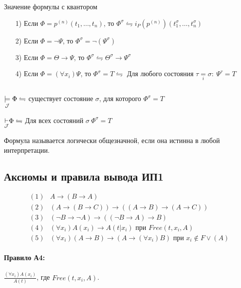 \begin{definition}
Значение формулы с квантором
\begin{itemize}
    \item[1)] Если $\Phi = p^{(n)}(t_1,\ldots,t_n)$, то $\Phi^{\sigma} \leftrightharpoons
        i_P(p^{(n)})(t_1^{\sigma},\ldots,t_n^{\sigma})$ 
    \item[2)] Если $\Phi = \lnot\Psi$, то  $\Phi^{\sigma} = \lnot(\Psi^{\sigma})$ 
    \item[3)] Если $\Phi = \Theta \to \Psi$, то $\Phi^{\sigma} \leftrightharpoons
        \Theta^{\sigma} \to \Psi^{\sigma}$ 
    \item[4)] Если $\Phi = (\forall x_{i})\Psi$, то $\Phi^{\sigma} = T \leftrightharpoons$ 
        Для любого состояния $\tau \underset{i}{=}\sigma :\ \Psi^{\tau} = T$
\end{itemize}
\end{definition}


\begin{definition} ${}$ \newline

$\underset{{\cal J}}{\models} \Phi \leftrightharpoons$ существует состояние $\sigma$, для
которого  $\Phi^{\sigma} = T$

$\underset{{\cal J}}{\operatorname{\vdash}} \Phi \leftrightharpoons$ Для всех состояний $\sigma \ \Phi^{\sigma} = T$

Формула называется логически общезначной, если она истинна в любой интерпретации.
\end{definition}


\subsection{Аксиомы и правила вывода ИП1}


\[
\begin{matrix}
    & (1) & A \to (B \to A)\\
    & (2) & (A \to (B \to C)) \to ((A \to B) \to (A\to C))\\
    & (3) & (\lnot B \to \lnot A) \to ((\lnot B \to A) \to B)\\
    & (4) & (\forall x_{i})A(x_{i}) \to A(t|x_{i})\text{ при } Free(t,x_{i},A)\\
    & (5) & (\forall x_{i})(A \to B) \to (A \to (\forall x_{i})B)\text{ при } x_{i} \not\in F \lor (A)
\end{matrix}
\] 

\paragraph*{Правило А4:} $\frac{(\forall x_{i})A(x_{i})}{A(t)}$, где $Free(t,x_{i},A)$.


